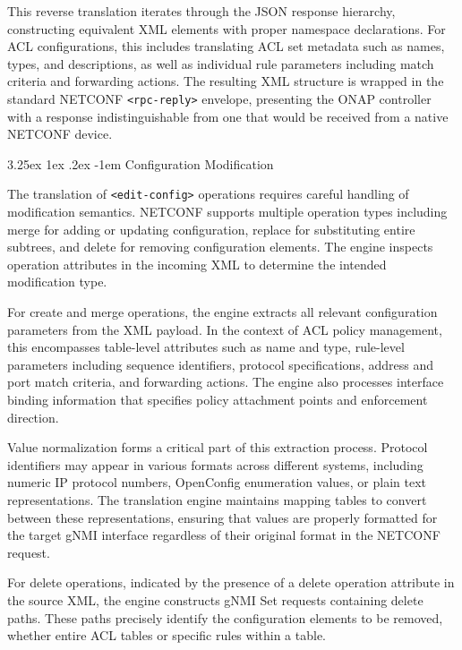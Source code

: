 \documentclass[12pt, a4paper, reqno, oneside]{book}
\makeatletter
\renewcommand\paragraph{\@startsection{paragraph}{5}{\z@}%
  {3.25ex \@plus1ex \@minus.2ex}%
  {-1em}%
  {\normalfont\normalsize\bfseries}}
\makeatother
\begin{document}
This reverse translation iterates through the JSON response hierarchy, constructing equivalent XML elements with proper namespace declarations. For ACL configurations, this includes translating ACL set metadata such as names, types, and descriptions, as well as individual rule parameters including match criteria and forwarding actions. The resulting XML structure is wrapped in the standard NETCONF \texttt{<rpc-reply>} envelope, presenting the ONAP controller with a response indistinguishable from one that would be received from a native NETCONF device.

\paragraph{Configuration Modification}

The translation of \texttt{<edit-config>} operations requires careful handling of modification semantics. NETCONF supports multiple operation types including merge for adding or updating configuration, replace for substituting entire subtrees, and delete for removing configuration elements. The engine inspects operation attributes in the incoming XML to determine the intended modification type.

For create and merge operations, the engine extracts all relevant configuration parameters from the XML payload. In the context of ACL policy management, this encompasses table-level attributes such as name and type, rule-level parameters including sequence identifiers, protocol specifications, address and port match criteria, and forwarding actions. The engine also processes interface binding information that specifies policy attachment points and enforcement direction.

Value normalization forms a critical part of this extraction process. Protocol identifiers may appear in various formats across different systems, including numeric IP protocol numbers, OpenConfig enumeration values, or plain text representations. The translation engine maintains mapping tables to convert between these representations, ensuring that values are properly formatted for the target gNMI interface regardless of their original format in the NETCONF request.

For delete operations, indicated by the presence of a delete operation attribute in the source XML, the engine constructs gNMI Set requests containing delete paths. These paths precisely identify the configuration elements to be removed, whether entire ACL tables or specific rules within a table.
\end{document}
